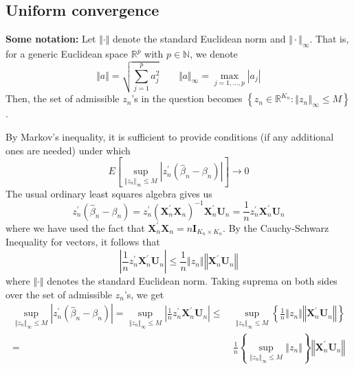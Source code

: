 \subsection{Uniform convergence}

\textbf{Some notation:} Let \(\Vert \cdot \Vert\) denote the standard Euclidean
norm and \(\Vert \cdot \Vert_{\infty}\). That is, for a generic Euclidean space
\(\mathbb{R}^{p}\) with \(p \in \mathbb{N}\), we denote
\[
  \Vert a \Vert = \sqrt{\sum_{j = 1}^{p} a_{j}^{2}} \qquad \Vert a \Vert_{\infty}
  = \max_{j = 1, \dots, p} \left| a_{j} \right|
\]
Then, the set of admissible \(z_{n}\)'s in the question becomes \(\left\{ z_{n}
\in \mathbb{R}^{K_{n}} : \left\Vert z_{n} \right\Vert_{\infty} \leq M
\right\}\).

By Markov's inequality, it is sufficient to provide conditions (if any
additional ones are needed) under which
\[
  E \left[ \sup_{\left\Vert z_{n} \right\Vert_{\infty} \leq M} \left|
  z_{n}^{\prime} \left( \widehat{\beta}_{n} - \beta_{n} \right) \right| \right]
  \to 0
\]
The usual ordinary least squares algebra gives us
\[
  z_{n}^{\prime} \left( \widehat{\beta}_{n} - \beta_{n} \right) = z_{n}^{\prime}
  \left( \mathbf{X}_{n}^{\prime} \mathbf{X}_{n} \right)^{- 1}
  \mathbf{X}_{n}^{\prime} \mathbf{U}_{n} = \frac{1}{n} z_{n}^{\prime}
  \mathbf{X}_{n}^{\prime} \mathbf{U}_{n}
\]
where we have used the fact that \(\mathbf{X}_{n}^{\prime} \mathbf{X}_{n} = n
\mathbf{I}_{K_{n} \times K_{n}}\). By the Cauchy-Schwarz Inequality for vectors,
it follows that
\[
  \left| \frac{1}{n} z_{n}^{\prime} \mathbf{X}_{n}^{\prime} \mathbf{U}_{n}
  \right| \leq \frac{1}{n} \left\Vert z_{n} \right\Vert
  \left\Vert \mathbf{X}_{n}^{\prime} \mathbf{U}_{n} \right\Vert
\]
where \(\Vert \cdot \Vert\) denotes the standard Euclidean norm. Taking suprema
on both sides over the set of admissible \(z_{n}\)'s, we get
\begin{equation}
  \begin{split}
    \sup_{\left\Vert z_{n} \right\Vert_{\infty} \leq M} \left| z_{n}^{\prime}
    \left( \widehat{\beta}_{n} - \beta_{n} \right) \right| = \sup_{\left\Vert
    z_{n} \right\Vert_{\infty} \leq M} \left| \frac{1}{n} z_{n}^{\prime}
    \mathbf{X}_{n}^{\prime} \mathbf{U}_{n} \right| \leq & \ \sup_{\left\Vert
    z_{n} \right\Vert_{\infty} \leq M} \left\{ \frac{1}{n} \left\Vert z_{n}
    \right\Vert \left\Vert \mathbf{X}_{n}^{\prime} \mathbf{U}_{n} \right\Vert
    \right\} \\
    = & \ \frac{1}{n} \left\{ \sup_{\left\Vert z_{n} \right\Vert_{\infty} \leq
    M} \left\Vert z_{n} \right\Vert \right\} \left\Vert \mathbf{X}_{n}^{\prime}
    \mathbf{U}_{n} \right\Vert
  \end{split}
  \label{eqn:2014q2:mainbound1arg}
\end{equation}
